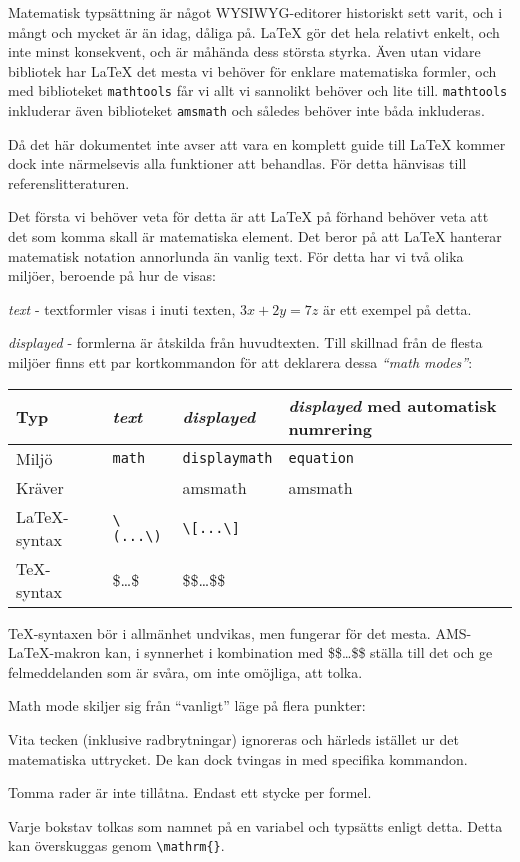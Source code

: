 Matematisk typsättning är något WYSIWYG-editorer historiskt sett varit, och i mångt och mycket är än idag, dåliga på. \LaTeX{} gör det hela relativt enkelt, och inte minst konsekvent, och är måhända dess största styrka. Även utan vidare bibliotek har \LaTeX{} det mesta vi behöver för enklare matematiska formler, och med biblioteket \texttt{mathtools} får vi allt vi sannolikt behöver och lite till. \texttt{mathtools} inkluderar även biblioteket \texttt{amsmath} och således behöver inte båda inkluderas.

Då det här dokumentet inte avser att vara en komplett guide till \LaTeX{} kommer dock inte närmelsevis alla funktioner att behandlas. För detta hänvisas till referenslitteraturen.

Det första vi behöver veta för detta är att \LaTeX{} på förhand behöver veta att det som komma skall är matematiska element. Det beror på att \LaTeX{} hanterar matematisk notation annorlunda än vanlig text. För detta har vi två olika miljöer, beroende på hur de visas:
\itb
  \item \emph{text} - textformler visas i inuti texten,  $3x+2y=7z$ är ett exempel på detta.
  \item \emph{displayed} - formlerna är åtskilda från huvudtexten.
\ite
Till skillnad från de flesta miljöer finns ett par kortkommandon för att deklarera dessa \emph{``math modes''}:

\begin{tabular}{|l|l|l|p{9.5cm}|}
  \hline
  Typ & \emph{text} & \emph{displayed} & \emph{displayed} med automatisk numrering\\\hline
  Miljö & \texttt{math} & \texttt{displaymath} & \texttt{equation} \\\hline
  Kräver & & amsmath & amsmath\\\hline
  \LaTeX{}-syntax & \verb+\(...\)+ & \verb+\[...\]+ & \\\hline
  \TeX{}-syntax & \$\ldots\$ & \$\$\ldots\$\$ &\\\hline
\end{tabular}

\TeX-syntaxen bör i allmänhet undvikas, men fungerar för det mesta. AMS-LaTeX-makron kan, i synnerhet i kombination med \$\$\ldots\$\$ ställa till det och ge felmeddelanden som är svåra, om inte omöjliga, att tolka.

Math mode skiljer sig från ``vanligt'' läge på flera punkter:
\itb
\item Vita tecken (inklusive radbrytningar) ignoreras och härleds istället ur det matematiska uttrycket. De kan dock tvingas in med specifika kommandon.
\item Tomma rader är inte tillåtna. Endast ett stycke per formel.
\item Varje bokstav tolkas som namnet på en variabel och typsätts enligt detta. Detta kan överskuggas genom \verb+\mathrm{}+.
\ite


